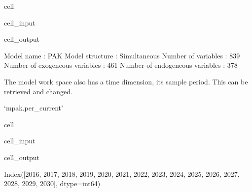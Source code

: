 \documentclass[letterpaper,10pt,english]{jupyterBook}
\begin{document}
\begin{sphinxuseclass}{cell}\begin{sphinxVerbatimInput}

\begin{sphinxuseclass}{cell_input}
\begin{sphinxVerbatim}[commandchars=\\\{\}]
\end{sphinxVerbatim}

\end{sphinxuseclass}\end{sphinxVerbatimInput}
\begin{sphinxVerbatimOutput}

\begin{sphinxuseclass}{cell_output}
\begin{sphinxVerbatim}[commandchars=\\\{\}]
\PYGZlt{}
Model name                              :                  PAK 
Model structure                         :         Simultaneous 
Number of variables                     :                  839 
Number of exogeneous  variables         :                  461 
Number of endogeneous variables         :                  378 
\PYGZgt{}
\end{sphinxVerbatim}

\end{sphinxuseclass}\end{sphinxVerbatimOutput}

\end{sphinxuseclass}
\sphinxAtStartPar
The model work space also has a time dimension, its sample period. This can be retrieved and changed.

\sphinxAtStartPar
`mpak.per\_current’

\begin{sphinxuseclass}{cell}\begin{sphinxVerbatimInput}

\begin{sphinxuseclass}{cell_input}
\begin{sphinxVerbatim}[commandchars=\\\{\}]
\end{sphinxVerbatim}

\end{sphinxuseclass}\end{sphinxVerbatimInput}
\begin{sphinxVerbatimOutput}

\begin{sphinxuseclass}{cell_output}
\begin{sphinxVerbatim}[commandchars=\\\{\}]
Index([2016, 2017, 2018, 2019, 2020, 2021, 2022, 2023, 2024, 2025, 2026, 2027,
       2028, 2029, 2030],
      dtype=\PYGZsq{}int64\PYGZsq{})
\end{sphinxVerbatim}

\end{sphinxuseclass}\end{sphinxVerbatimOutput}

\end{sphinxuseclass}
\end{document}
